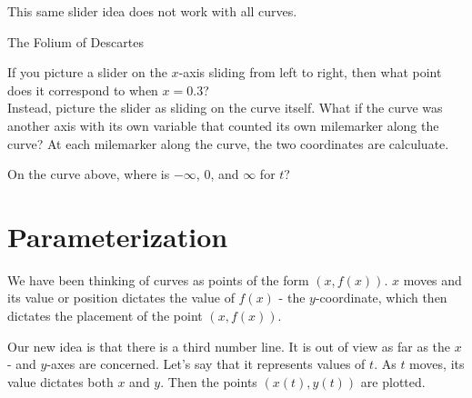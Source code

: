 \documentclass{ximera}
\begin{document}
\begin{center}
\end{center}




This same slider idea does not work with all curves.





The Folium of Descartes





\begin{center}
\end{center}


If you picture a slider on the $x$-axis sliding from left to right, then what point does it correspond to when $x = 0.3$? \\


Instead, picture the slider as sliding on the curve itself. What if the curve was another axis with its own variable that counted its own milemarker along the curve? At each milemarker along the curve, the two coordinates are calculuate.





\begin{center}
\end{center}





On the curve above, where is $-\infty$, $0$, and $\infty$ for $t$?







\section{Parameterization}




We have been thinking of curves as points of the form $(x, f(x))$. $x$ moves and its value or position dictates the value of $f(x)$ - the $y$-coordinate, which then dictates the placement of the point $(x, f(x))$.


Our new idea is that there is a third number line.  It is out of view as far as the $x$- and $y$-axes are concerned.  Let's say that it represents values of $t$.  As $t$ moves, its value dictates both $x$ and $y$. Then the points $(x(t), y(t))$ are plotted.
\end{document}
